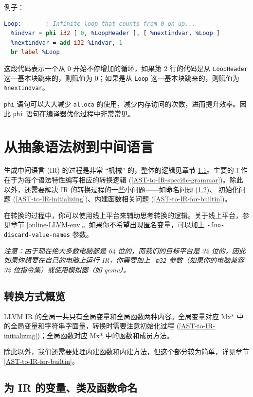 例子：
\begin{lstlisting}[language=llvm]
Loop:       ; Infinite loop that counts from 0 on up...
  %indvar = phi i32 [ 0, %LoopHeader ], [ %nextindvar, %Loop ]
  %nextindvar = add i32 %indvar, 1
  br label %Loop
\end{lstlisting}

这段代码表示一个从 0 开始不停增加的循环，如果第 2 行的代码是从 \texttt{LoopHeader}
这一基本块跳来的，则赋值为 0；如果是从 \texttt{Loop} 这一基本块跳来的，则赋值为
\texttt{\%nextindvar}。

\texttt{phi} 语句可以大大减少 \texttt{alloca} 的使用，减少内存访问的次数，进而提升效率。因此
\texttt{phi} 语句在编译器优化过程中非常常见。

\section{从抽象语法树到中间语言}\label{AST-to-IR}

生成中间语言 (IR) 的过程是非常 “机械” 的，整体的逻辑见章节
\ref{AST-to-IR-details}。主要的工作在于为每个语法特性编写相应的转换逻辑
(\ref{AST-to-IR-specific-grammar})。除此以外，还需要解决
IR 的转换过程的一些小问题——如命名问题 (\ref{AST-to-IR-naming})、
初始化问题 (\ref{AST-to-IR-initializing})、内建函数相关问题
(\ref{AST-to-IR-for-builtin})。

在转换的过程中，你可以使用线上平台来辅助思考转换的逻辑。关于线上平台，参见章节
\ref{online-LLVM-env}。如果你不希望出现匿名变量，可以加上
\texttt{-fno-discard-value-names} 参数。

\textit{注意：由于现在绝大多数电脑都是 64 位的，而我们的目标平台是 32
位的，因此如果你想要在自己的电脑上运行 IR，你需要加上 \texttt{-m32} 参数（如果你的电脑兼容
32 位指令集）或使用模拟器（如 qemu）。}

\subsection{转换方式概览}\label{AST-to-IR-details}

LLVM IR 的全局一共只有全局变量和全局函数两种内容。全局变量对应 Mx*
中的全局变量和字符串字面量，转换时需要注意初始化过程
(\ref{AST-to-IR-initializing})；全局函数对应 Mx* 中的函数和成员方法。

除此以外，我们还需要处理内建函数和内建方法，但这个部分较为简单，详见章节
\ref{AST-to-IR-for-builtin}。

\subsection{为 IR 的变量、类及函数命名}\label{AST-to-IR-naming}

